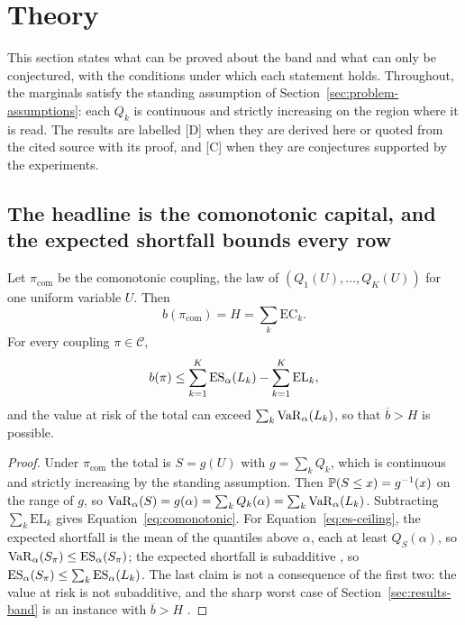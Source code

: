\section{Theory}
\label{sec:theory}

This section states what can be proved about the band and what can only be conjectured, with the conditions under which each
statement holds. Throughout, the marginals satisfy the standing assumption of Section~\ref{sec:problem-assumptions}: each $Q_k$ is
continuous and strictly increasing on the region where it is read. The results are labelled [D] when they are derived here or
quoted from the cited source with its proof, and [C] when they are conjectures supported by the experiments.

\subsection{The headline is the comonotonic capital, and the expected shortfall bounds every row}
\label{sec:theory-headline}

\begin{proposition}
\label{prop:headline}
Let $\pi_{\mathrm{com}}$ be the comonotonic coupling, the law of $(Q_1(U),\dots,Q_K(U))$ for one uniform variable $U$. Then
\begin{equation}
b(\pi_{\mathrm{com}})=H=\sum_k\mathrm{EC}_k .
\label{eq:comonotonic}
\end{equation}
For every coupling $\pi\in\mathcal C$,
\begin{equation}
b(\pi)\le\sum_{k=1}^K\operatorname{ES}_\alpha(L_k)-\sum_{k=1}^K\mathrm{EL}_k ,
\label{eq:es-ceiling}
\end{equation}
and the value at risk of the total can exceed $\sum_k\operatorname{VaR}_\alpha(L_k)$, so that $\overline b>H$ is possible.
\end{proposition}

\begin{proof}
Under $\pi_{\mathrm{com}}$ the total is $S=g(U)$ with $g=\sum_kQ_k$, which is continuous and strictly increasing by the standing
assumption. Then $\mathbb{P}(S\le x)=g^{-1}(x)$ on the range of $g$, so $\operatorname{VaR}_\alpha(S)=g(\alpha)=\sum_kQ_k(\alpha)=\sum_k\operatorname{VaR}_\alpha(L_k)$.
Subtracting $\sum_k\mathrm{EL}_k$ gives Equation~\ref{eq:comonotonic}. For Equation~\ref{eq:es-ceiling}, the expected shortfall
is the mean of the quantiles above $\alpha$, each at least $Q_S(\alpha)$, so $\operatorname{VaR}_\alpha(S_\pi)\le\operatorname{ES}_\alpha(S_\pi)$; the expected
shortfall is subadditive \citep{acerbi2002,artzner1999}, so $\operatorname{ES}_\alpha(S_\pi)\le\sum_k\operatorname{ES}_\alpha(L_k)$. The last claim is not a
consequence of the first two: the value at risk is not subadditive, and the sharp worst case of Section~\ref{sec:results-band} is
an instance with $\overline b>H$ \citep{ems2002,epr2013}.
\end{proof}

